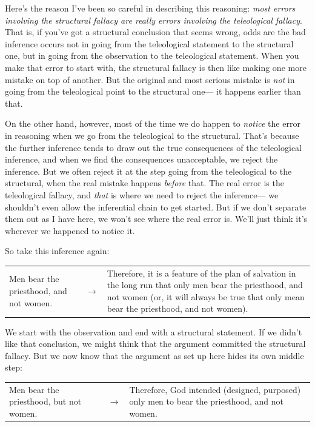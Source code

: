 		Here's the reason I've been so careful in describing this reasoning:
			\textit{most errors involving the structural fallacy are really errors involving the teleological fallacy}.
		That is,
			if you've got a structural conclusion that seems wrong,
				odds are the bad inference occurs not in going from the teleological statement to the structural one,
					but in going from the observation to the teleological statement.
		When you make that error to start with,
			the structural fallacy is then like making one more mistake on top of another.
		But the original and most serious mistake is \textit{not} in going from the teleological point to the structural one---%
			it happens earlier than that.
			
		On the other hand,
			however,
				most of the time we do happen to \textit{notice} the error in reasoning when we go from the teleological to the structural.
		That's because the further inference tends to draw out the true consequences of the teleological inference,
			and when we find the consequences unacceptable,
				we reject the inference.
		But we often reject it at the step going from the teleological to the structural,
			when the real mistake happens \textit{before} that.
		The real error is the teleological fallacy,
			and \textit{that} is where we need to reject the inference---%
				we shouldn't even allow the inferential chain to get started.
		But if we don't separate them out as I have here,
			we won't see where the real error is.
		We'll just think it's wherever we happened to notice it.
	
		So take this inference again:
		
		\begin{table}[H]
		\centering
		\begin{tabular}{p{7cm}p{0.5cm}p{7cm}}
		Men bear the priesthood, and not women. & $\rightarrow$ & Therefore, it is a feature of the plan of salvation in the long run that only men bear the priesthood, and not women (or, it will always be true that only mean bear the priesthood, and not women).
		\end{tabular}
		\end{table}
		
		We start with the observation and end with a structural statement.
		If we didn't like that conclusion,
			we might think that the argument committed the structural fallacy.
		But we now know that the argument as set up here hides its own middle step:
		
		\begin{table}[H]
		\centering
		\begin{tabular}{p{7cm}p{0.5cm}p{7cm}}
		Men bear the priesthood, but not women. & $\rightarrow$ & Therefore, God intended (designed, purposed) only men to bear the priesthood, and not women.
		\end{tabular}
		\end{table}
		

